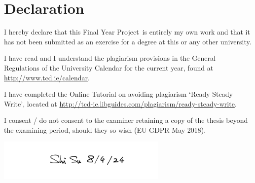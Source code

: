 \documentclass[a4paper,oneside,12pt]{book}
\title{\thesistitle}
\author{\authorname}
\newcommand{\typeofthesis}{Final Year Project} %
\begin{document}

\section*{\Huge\textcolor{tcd_blue}{Declaration}}
\vspace{1cm}
I hereby declare that this \typeofthesis\ is entirely my own work and that it has not been submitted as an exercise for a degree at this or any other university.

\vspace{1cm}
I have read and I understand the plagiarism provisions in the General Regulations of the University Calendar for the current year, found at \url{http://www.tcd.ie/calendar}.
\vspace{1cm}

I have completed the Online Tutorial on avoiding plagiarism `Ready Steady Write', located at \url{http://tcd-ie.libguides.com/plagiarism/ready-steady-write}.
\vspace{1cm}

I consent / do not consent to the examiner retaining a copy of the thesis beyond the examining period, should they so wish (EU GDPR May 2018).
\vspace{1cm}


\hfill\includegraphics[height=2cm]{signature.png}



\end{document}
